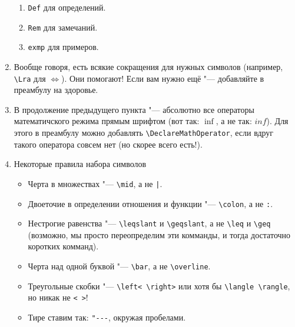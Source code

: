 \documentclass[12pt,a4paper]{book}
\def\Lra{\Leftrightarrow}
\begin{document}
\begin{enumerate}
\begin{enumerate}
\item \verb'Def' для определений.
\item \verb'Rem' для замечаний.
\item \verb'exmp' для примеров.
\end{enumerate}
\item Вообще говоря, есть всякие сокращения для нужных символов (например, \verb'\Lra' для $\Lra$). Они помогают! Если вам нужно ещё "--- добавляйте в преамбулу на здоровье.
\item В продолжение предыдущего пункта "--- абсолютно все операторы математичского режима прямым шрифтом (вот так: $\inf$, а не так: $inf$). Для этого в преамбулу можно добавлять \verb'\DeclareMathOperator', если вдруг такого оператора совсем нет (но скорее всего есть!).
\item Некоторые правила набора символов
\begin{itemize}
\item Черта в множествах "--- \verb'\mid', а не \verb'|'.
\item Двоеточие в определении отношения и функции "--- \verb'\colon', а не \verb':'.
\item Нестрогие равенства "--- \verb'\leqslant' и \verb'\geqslant', а не \verb'\leq' и \verb'\geq' (возможно, мы просто переопределим эти комманды, и тогда достаточно коротких комманд).
\item Черта над одной буквой "--- \verb'\bar', а не \verb'\overline'.
\item Треугольные скобки "--- \verb'\left< \right>' или хотя бы \verb'\langle \rangle', но никак не \verb'< >'!
\item Тире ставим так: \verb'"---', окружая пробелами.
\end{itemize}
\end{enumerate}
\end{document}
